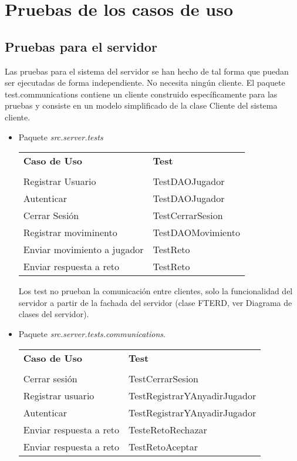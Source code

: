 \section{Pruebas de los casos de uso}

\subsection{Pruebas para el servidor}

Las pruebas para el sistema del servidor se han hecho de tal forma que puedan ser ejecutadas de forma independiente. No necesita ningún cliente. El paquete test.communications contiene un cliente construido específicamente para las pruebas y consiste en un modelo simplificado de la clase Cliente del sistema cliente.

\begin{itemize}
\item Paquete \emph{src.server.tests}

\begin{center}
{\footnotesize
\begin{tabularx}{0.95\textwidth}{p{}|X}

\textbf{Caso de Uso} & \textbf{Test} \\
& \\
Registrar Usuario & TestDAOJugador\\
Autenticar & TestDAOJugador\\
Cerrar Sesión & TestCerrarSesion\\
Registrar moviminento & TestDAOMovimiento\\
Enviar movimiento a jugador & TestReto\\
Enviar respuesta a reto & TestReto\\
\end{tabularx}
}
\end{center}

Los test no prueban la comunicación entre clientes, solo la funcionalidad del servidor a partir de la fachada del servidor (clase FTERD, ver Diagrama de clases del servidor).

\item Paquete \emph{src.server.tests.communications}.
\begin{center}
{\footnotesize
\begin{tabularx}{0.95\textwidth}{p{}|X}
\textbf{Caso de Uso} & \textbf{Test} \\
& \\
Cerrar sesión & TestCerrarSesion\\
Registrar usuario & TestRegistrarYAnyadirJugador\\
Autenticar & TestRegistrarYAnyadirJugador\\
Enviar respuesta a reto & TesteRetoRechazar\\
Enviar respuesta a reto & TestRetoAceptar\\
\end{tabularx}
}
\end{center}
\end{itemize}


